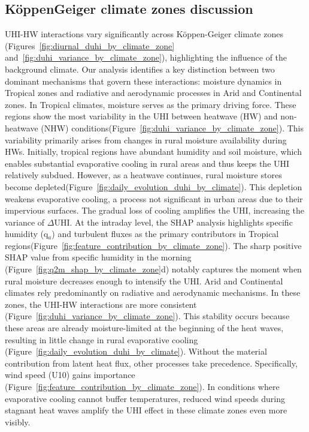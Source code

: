 \subsection*{K{\"{o}}ppen{\textendash}Geiger climate zones discussion}UHI-HW interactions vary significantly across K{\"{o}}ppen-Geiger climate zones (Figures~\ref{fig:diurnal_duhi_by_climate_zone} and~\ref{fig:duhi_variance_by_climate_zone}), highlighting the influence of the background climate. Our analysis identifies a key distinction between two dominant mechanisms that govern these interactions: moisture dynamics in Tropical zones and radiative and aerodynamic processes in Arid and Continental zones. \mbox{}\protect\newline In Tropical climates, moisture serves as the primary driving force. These regions show the most variability in the UHI between heatwave (HW) and non-heatwave (NHW) conditions(Figure~\ref{fig:duhi_variance_by_climate_zone}). This variability primarily arises from changes in rural moisture availability during HWs. Initially, tropical regions have abundant humidity and soil moisture, which enables substantial evaporative cooling in rural areas and thus keeps the UHI relatively subdued. However, as a heatwave continues, rural moisture stores become depleted(Figure~\ref{fig:daily_evolution_duhi_by_climate}). This depletion weakens evaporative cooling, a process not significant in urban areas due to their impervious surfaces. The gradual loss of cooling amplifies the UHI, increasing the variance of \ensuremath{\Delta }UHI. At the intraday level, the SHAP analysis highlights specific humidity (q\ensuremath{_{a}}) and turbulent fluxes as the primary contributors in Tropical regions(Figure~\ref{fig:feature_contribution_by_climate_zone}). The sharp positive SHAP value from specific humidity in the morning (Figure~\ref{fig:q2m_shap_by_climate_zone}d) notably captures the moment when rural moisture decreases enough to intensify the UHI. \mbox{}\protect\newline Arid and Continental climates rely predominantly on radiative and aerodynamic mechanisms. In these zones, the UHI-HW interactions are more consistent (Figure~\ref{fig:duhi_variance_by_climate_zone}). This stability occurs because these areas are already moisture-limited at the beginning of the heat waves, resulting in little change in rural evaporative cooling (Figure~\ref{fig:daily_evolution_duhi_by_climate}). Without the material contribution from latent heat flux, other processes take precedence. Specifically, wind speed (U10) gains importance (Figure~\ref{fig:feature_contribution_by_climate_zone}). In conditions where evaporative cooling cannot buffer temperatures, reduced wind speeds during stagnant heat waves amplify the UHI effect in these climate zones even more visibly.

